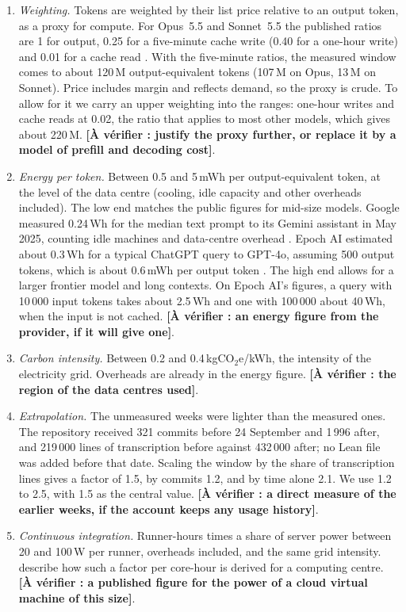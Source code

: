 \documentclass[11pt,a4paper]{article}
\newcommand{\todo}[1]{\textbf{[À vérifier : #1]}}
\newcommand{\COe}{\,kgCO$_2$e}
\begin{document}
\begin{enumerate}
\item \emph{Weighting.} Tokens are weighted by their list price relative to an output token, as a proxy for compute. For Opus~5.5 and Sonnet~5.5 the published ratios are 1 for output, 0.25 for a five-minute cache write (0.40 for a one-hour write) and 0.01 for a cache read \citep{anthropicpricing}. With the five-minute ratios, the measured window comes to about 120\,M output-equivalent tokens (107\,M on Opus, 13\,M on Sonnet). Price includes margin and reflects demand, so the proxy is crude. To allow for it we carry an upper weighting into the ranges: one-hour writes and cache reads at 0.02, the ratio that applies to most other models, which gives about 220\,M. \todo{justify the proxy further, or replace it by a model of prefill and decoding cost}.
\item \emph{Energy per token.} Between 0.5 and 5\,mWh per output-equivalent token, at the level of the data centre (cooling, idle capacity and other overheads included). The low end matches the public figures for mid-size models. Google measured 0.24\,Wh for the median text prompt to its Gemini assistant in May 2025, counting idle machines and data-centre overhead \citep{elsworth2025}. Epoch AI estimated about 0.3\,Wh for a typical ChatGPT query to GPT-4o, assuming 500 output tokens, which is about 0.6\,mWh per output token \citep{you2025epoch}. The high end allows for a larger frontier model and long contexts. On Epoch AI's figures, a query with 10\,000 input tokens takes about 2.5\,Wh and one with 100\,000 about 40\,Wh, when the input is not cached. \todo{an energy figure from the provider, if it will give one}.
\item \emph{Carbon intensity.} Between 0.2 and 0.4\COe/kWh, the intensity of the electricity grid. Overheads are already in the energy figure. \todo{the region of the data centres used}.
\item \emph{Extrapolation.} The unmeasured weeks were lighter than the measured ones. The repository received 321 commits before 24 September and 1\,996 after, and 219\,000 lines of transcription before against 432\,000 after; no Lean file was added before that date. Scaling the window by the share of transcription lines gives a factor of 1.5, by commits 1.2, and by time alone 2.1. We use 1.2 to 2.5, with 1.5 as the central value. \todo{a direct measure of the earlier weeks, if the account keeps any usage history}.
\item \emph{Continuous integration.} Runner-hours times a share of server power between 20 and 100\,W per runner, overheads included, and the same grid intensity. \citet{benaben2024} describe how such a factor per core-hour is derived for a computing centre. \todo{a published figure for the power of a cloud virtual machine of this size}.

\end{enumerate}
\end{document}

